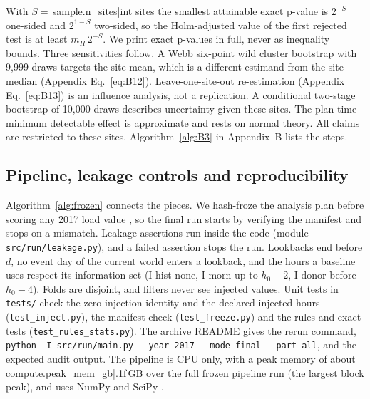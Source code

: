 With $S=\,${{sample.n_sites|int}} sites the smallest attainable exact p-value is $2^{-S}$ one-sided and $2^{1-S}$ two-sided, so the Holm-adjusted value of the first rejected test is at least $m_H\,2^{-S}$. We print exact p-values in full, never as inequality bounds. Three sensitivities follow. A Webb six-point wild cluster bootstrap with 9{,}999 draws \cite{webb2023,cameron2008} targets the site mean, which is a different estimand from the site median (Appendix Eq.~\eqref{eq:B12}). Leave-one-site-out re-estimation (Appendix Eq.~\eqref{eq:B13}) is an influence analysis, not a replication. A conditional two-stage bootstrap of 10{,}000 draws describes uncertainty given these sites. The plan-time minimum detectable effect is approximate and rests on normal theory. All claims are restricted to these sites. Algorithm~\ref{alg:B3} in Appendix~B lists the steps.

\subsection{Pipeline, leakage controls and reproducibility}\label{sec:methods:pipeline}

Algorithm~\ref{alg:frozen} connects the pieces. We hash-froze the analysis plan before scoring any 2017 load value \cite{nosek2018}, so the final run starts by verifying the manifest and stops on a mismatch. Leakage assertions run inside the code (module \texttt{src/run/leakage.py}), and a failed assertion stops the run. Lookbacks end before $d$, no event day of the current world enters a lookback, and the hours a baseline uses respect its information set (I-hist none, I-morn up to $h_0-2$, I-donor before $h_0-4$). Folds are disjoint, and filters never see injected values. Unit tests in \texttt{tests/} check the zero-injection identity and the declared injected hours (\texttt{test\_inject.py}), the manifest check (\texttt{test\_freeze.py}) and the rules and exact tests (\texttt{test\_rules\_stats.py}). The archive README gives the rerun command, \texttt{python -I src/run/main.py -{}-year 2017 -{}-mode final -{}-part all}, and the expected audit output. The pipeline is CPU only, with a peak memory of about {{compute.peak_mem_gb|.1f}}\,GB over the full frozen pipeline run (the largest block peak), and uses NumPy and SciPy \cite{harris2020numpy,virtanen2020scipy}.


